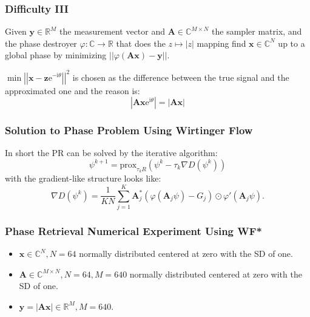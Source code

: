 \begin{frame}
    \frametitle{Difficulty III}
    \begin{Pro}
        Given $\boldsymbol{y} \in \mathbb{R}^M$ the measurement vector and $\boldsymbol{A} \in \mathbb{C}^{M \times N}$ the sampler matrix, 
        and the phase destroyer $\varphi \colon \mathbb{C} \to \mathbb{R}$ that does the
         $z \mapsto \left|z\right|$ mapping find $\boldsymbol{x} \in \mathbb{C}^N$ up to a global phase 
        by minimizing $ \left|\left|\varphi(\boldsymbol{A}\boldsymbol{x})-\boldsymbol{y}\right|\right|$.
      \end{Pro}
    \pause
    \begin{Rem} 
        $\min \left|\left|\boldsymbol{x}-\boldsymbol{z}\mathrm{e}^{-\mathrm{i}\theta}\right|\right|^2$ is chosen as the difference between the 
        true signal and the approximated one and the reason is:
        \begin{equation}
          \left|\boldsymbol{A}\boldsymbol{x}\mathrm{e}^{\mathrm{i}\theta}\right| = \left|\boldsymbol{A}\boldsymbol{x}\right|
        \end{equation}
      \end{Rem}

\end{frame}



\begin{frame}
    \frametitle{Solution to Phase Problem Using Wirtinger Flow}
    \pause
    In short the \acl*{PR} can be solved by the iterative algorithm:
    \pause
      \begin{equation}\label{eq:pr_solution}
        \psi^{k+1} = \text{prox}_{\tau_{k}R}(\psi^k-\tau_k\nabla{D(\psi^k)})
      \end{equation}
\pause
      with the gradient-like structure looks like: 
      \begin{equation}\label{eq:gradient_pr_solution}
        \nabla{D(\psi^k)} = \frac{1}{KN} \sum_{j=1}^{K} \boldsymbol{A}_j^*\left(\varphi\left(\boldsymbol{A}_j\psi\right)-G_j\right)\odot \varphi'(\boldsymbol{A}_j\psi).
      \end{equation}

\end{frame}


\begin{frame}
  \frametitle{Phase Retrieval Numerical Experiment Using WF*}
  \begin{itemize}
    \pause
    \item $\boldsymbol{x} \in \mathbb{C}^{N}, N=64$ normally distributed centered at zero with the SD of one.
    \pause
    \item $\boldsymbol{A} \in \mathbb{C}^{M \times N}, N=64, M=640$ normally distributed centered at zero with the SD of one. 
    \pause
    \item $\boldsymbol{y}= \left|\boldsymbol{A}\boldsymbol{x}\right| \in \mathbb{R}^M, M=640$.
  \end{itemize}
\end{frame}

